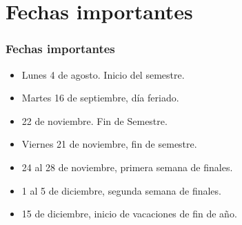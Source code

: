 \documentclass[12pt]{beamer}
\begin{document}
\section{Fechas importantes}
\begin{frame}
\frametitle{Fechas importantes}
\begin{itemize}
\item Lunes 4 de agosto. Inicio del semestre.
\item Martes 16 de septiembre, día feriado.
\item 22 de noviembre. Fin de Semestre.
\item Viernes 21 de noviembre, fin de semestre.
\item 24 al 28 de noviembre, primera semana de finales.
\item 1 al 5 de diciembre, segunda semana de finales.
\item 15 de diciembre, inicio de vacaciones de fin de año.
\end{itemize}
\end{frame}
\end{document}
